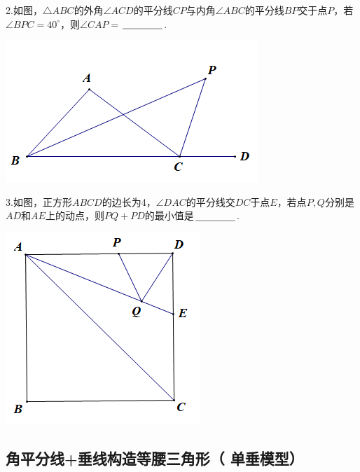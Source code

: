 \documentclass[10pt]{ctexart}
\begin{document}
\begin{shaded}
   2.如图，$\triangle ABC$的外角$\angle ACD$的平分线$CP$与内角$\angle ABC$的平分线$BP$交于点$P$，若$\angle BPC=40^\circ$，则$\angle CAP=$$\underline{\hspace{1.5cm}}$.
\end{shaded}

\begin{flushright}
	\includegraphics[scale=0.6]{figure/jiaopfxian05}
\end{flushright}

\begin{shaded}
  3.如图，正方形$ABCD$的边长为4，$\angle DAC$的平分线交$DC$于点$E$，若点$P,Q$分别是$AD$和$AE$上的动点，则$PQ+PD$的最小值是$\underline{\hspace{1.5cm}}$.
\end{shaded}

\begin{flushright}
	\includegraphics[scale=0.6]{figure/jiaopfxian06}
\end{flushright}

\subsection[单垂模型]{角平分线+垂线构造等腰三角形（ 单垂模型）}
\end{document}
